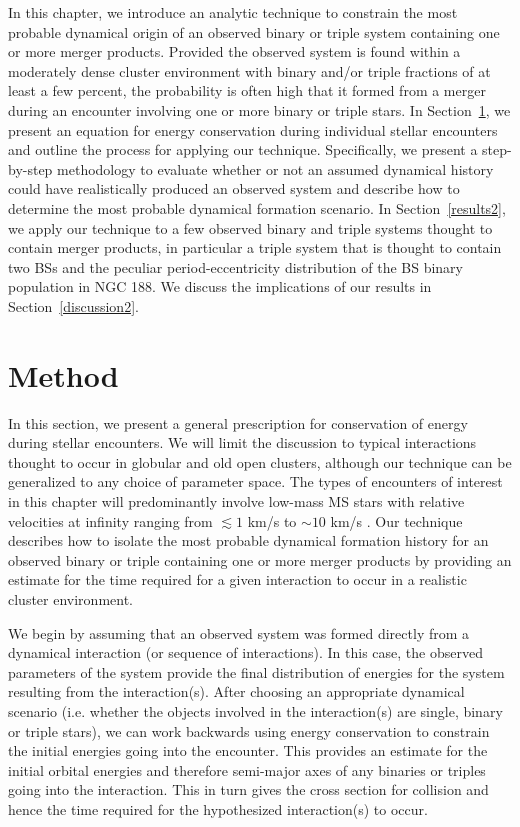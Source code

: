 In this chapter, we introduce an analytic technique to 
constrain the most probable dynamical origin of an observed binary or
triple system containing one or more merger products.  Provided the
observed system is found within a moderately dense cluster
environment with binary and/or triple fractions of at least a few
percent, the probability is often high that it formed from a merger
during 
an encounter involving one or more binary or triple stars.  In
Section~\ref{method2}, we present an equation for energy conservation 
during individual stellar encounters and outline the process for
applying our technique.  Specifically, we present a step-by-step
methodology to evaluate whether or not an assumed dynamical history
could have realistically produced an observed system and describe how
to determine the most probable dynamical formation scenario.  
In Section~\ref{results2}, we apply 
our technique to a few observed binary and triple systems thought to
contain merger 
products, in particular a triple system that is thought to contain two BSs and
the peculiar period-eccentricity distribution of the BS binary
population in NGC 188.  We discuss the implications of our results in
Section~\ref{discussion2}. 

\section{Method} \label{method2}

In this section, we present a general prescription for conservation of
energy during stellar encounters.  We will limit the
discussion to typical interactions thought to occur in globular and
old open clusters, although our technique can be generalized to any
choice of parameter space.  The types of encounters of interest
in this chapter will predominantly involve low-mass MS stars with 
relative velocities at infinity ranging from $\lesssim 1$ km/s
to $\sim 10$ km/s \citep[e.g.][]{leonard89, sigurdsson93}.  Our technique
describes how to isolate the most probable dynamical formation history
for an observed binary or triple containing one or more merger products
by providing an estimate for the time required for a given interaction
to occur in a realistic cluster environment.  

We begin by assuming that an observed system was formed
directly from a dynamical interaction (or sequence of
interactions).  In this case, the observed parameters of the system
provide the final distribution of energies for the system resulting 
from the interaction(s).  After choosing an appropriate dynamical
scenario (i.e. whether the objects involved in the interaction(s) are
single, binary or triple stars), we can work backwards using 
energy conservation to constrain the initial
energies going into the encounter.  
This provides an estimate for the initial orbital
energies and therefore semi-major axes of any binaries or 
triples going into the interaction.  This in turn gives the
cross section for collision and hence the time required for the
hypothesized interaction(s) to occur.  

